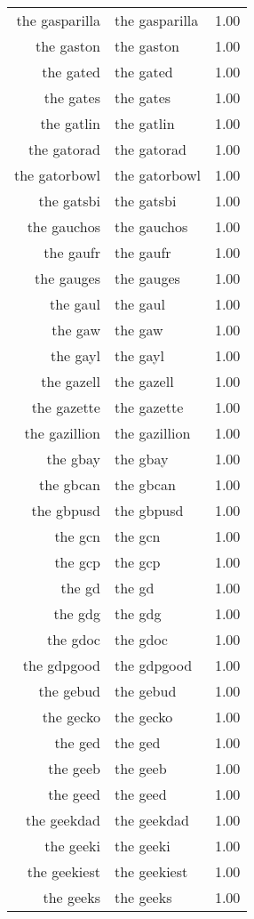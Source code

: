 \begin{table}[ht]
\begin{tabular}{rlr}
  the gasparilla & the gasparilla & 1.00 \\ 
  the gaston & the gaston & 1.00 \\ 
  the gated & the gated & 1.00 \\ 
  the gates & the gates & 1.00 \\ 
  the gatlin & the gatlin & 1.00 \\ 
  the gatorad & the gatorad & 1.00 \\ 
  the gatorbowl & the gatorbowl & 1.00 \\ 
  the gatsbi & the gatsbi & 1.00 \\ 
  the gauchos & the gauchos & 1.00 \\ 
  the gaufr & the gaufr & 1.00 \\ 
  the gauges & the gauges & 1.00 \\ 
  the gaul & the gaul & 1.00 \\ 
  the gaw & the gaw & 1.00 \\ 
  the gayl & the gayl & 1.00 \\ 
  the gazell & the gazell & 1.00 \\ 
  the gazette & the gazette & 1.00 \\ 
  the gazillion & the gazillion & 1.00 \\ 
  the gbay & the gbay & 1.00 \\ 
  the gbcan & the gbcan & 1.00 \\ 
  the gbpusd & the gbpusd & 1.00 \\ 
  the gcn & the gcn & 1.00 \\ 
  the gcp & the gcp & 1.00 \\ 
  the gd & the gd & 1.00 \\ 
  the gdg & the gdg & 1.00 \\ 
  the gdoc & the gdoc & 1.00 \\ 
  the gdpgood & the gdpgood & 1.00 \\ 
  the gebud & the gebud & 1.00 \\ 
  the gecko & the gecko & 1.00 \\ 
  the ged & the ged & 1.00 \\ 
  the geeb & the geeb & 1.00 \\ 
  the geed & the geed & 1.00 \\ 
  the geekdad & the geekdad & 1.00 \\ 
  the geeki & the geeki & 1.00 \\ 
  the geekiest & the geekiest & 1.00 \\ 
  the geeks & the geeks & 1.00 \\ 

\end{tabular}
\end{table}
